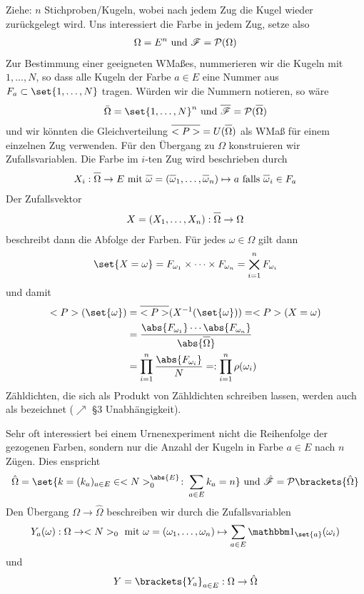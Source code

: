 Ziehe: $n$ Stichproben/Kugeln, wobei nach jedem Zug die Kugel wieder zurückgelegt wird. Uns interessiert die Farbe in jedem Zug, setze also
\begin{align}
	\Omega = E^n \text{ und } \mathscr{F} = \mathcal{P}(\Omega) \notag
\end{align}
Zur Bestimmung einer geeigneten WMaßes, nummerieren wir die Kugeln mit $1,\dots, N$, so dass alle Kugeln der Farbe $a \in E$ eine Nummer aus $F_{a} \subset \set{1,\dots, N}$ tragen. Würden wir die Nummern notieren, so wäre
\begin{align}
	\overline{\Omega} = \set{1,\dots, N}^n \und \overline{\sigF} = \pows(\overline{\Omega})\notag
\end{align}
und wir könnten die Gleichverteilung $\overline{\probp} = U(\overline{\Omega})$ als WMaß für einem einzelnen Zug verwenden. Für den Übergang zu $\Omega$ konstruieren wir  Zufallsvariablen. Die Farbe im $i$-ten Zug wird beschrieben durch
\begin{align}
	X_i: \overline{\Omega} \to E \mit \overline{\omega} = \left( \overline{\omega}_1, \dots, \overline{\omega}_n \right) \mapsto a \text{ falls } \overline{\omega}_i \in F_a\notag
\end{align}
Der Zufallsvektor
\begin{align}
	X = (X_1, \dots, X_n): \overline{\Omega} \to \Omega\notag
\end{align}
beschreibt dann die Abfolge der Farben. Für jedes $\omega \in \Omega$ gilt dann
\begin{align}
	\set{X = \omega} = F_{\omega_1} \times \cdots \times F_{\omega_n} = \bigtimes_{i=1}^{n} F_{\omega_i}\notag
\end{align}
und damit
\begin{align}
	\probp(\set{\omega}) 
	&= \overline{\probp}(X^{-1}(\set{\omega})) = \probp(X=\omega)\notag\\
	&= \frac{\abs{F_{\omega_1}} \cdots \abs{F_{\omega_n}}}{\abs{\overline{\Omega}}}\notag\\
	&= \prod_{i=1}^{n} \frac{\abs{F_{\omega_i}}}{N} =: \prod_{i=1}^{n} \rho(\omega_i)\notag
\end{align}
Zähldichten, die sich als Produkt von Zähldichten schreiben lassen, werden auch als  bezeichnet ($\nearrow$  \S 3 Unabhängigkeit). %

Sehr oft interessiert bei einem Urnenexperiment nicht die Reihenfolge der gezogenen Farben, sondern nur die Anzahl der Kugeln in Farbe $a \in E$ nach $n$ Zügen. Dies enspricht
\begin{align}
	 \hat{\Omega} 
	 = \set{k = (k_a)_{a \in E} \in \N_{0}^{\abs{E}} \colon \sum_{a \in E} k_a = n}
	 \und \hat{\sigF} = \pows\brackets{\hat{\Omega}}\notag
\end{align}
Den Übergang $\Omega \to \hat{\Omega}$ beschreiben wir durch die Zufallsvariablen
\begin{align}
	Y_a(\omega): \Omega \to \N_{0} \mit \omega = (\omega_1,\dots, \omega_n)\mapsto \sum_{a \in E} \indi_{\set{a}}(\omega_i)\notag
\end{align}
und
\begin{align}
	Y = \brackets{Y_a}_{a\in E}: \Omega \to \hat{\Omega}\notag
\end{align}

